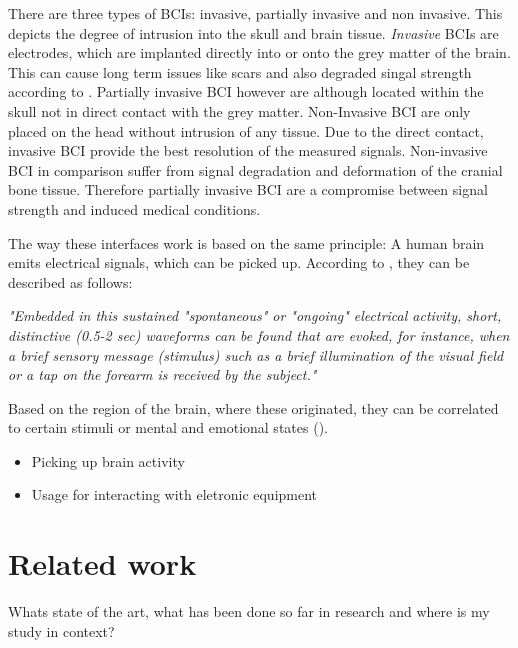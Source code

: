                 There are three types of BCIs: invasive, partially invasive and non invasive. This depicts the degree of intrusion into the skull and brain tissue. \textit{Invasive} BCIs are electrodes, which are implanted directly into or onto the grey matter of the brain. This can cause long term issues like scars and also degraded singal strength according to \cite{Abdulkader.2015}. 
                Partially invasive BCI however are although located within the skull not in direct contact with the grey matter.
                Non-Invasive BCI are only placed on the head without intrusion of any tissue.
                Due to the direct contact, invasive BCI provide the best resolution of the measured signals. Non-invasive BCI in comparison suffer from signal degradation and deformation of the cranial bone tissue. 
                Therefore partially invasive BCI are a compromise between signal strength and induced medical conditions.

                The way these interfaces work is based on the same principle: A human brain emits electrical signals, which can be picked up.
                According to \cite{Vidal.1973}, they can be described as follows:

                \medskip
                \emph{"Embedded in this sustained "spontaneous" or "ongoing" electrical activity, short, distinctive (0.5-2 sec) waveforms can be found that are evoked, for instance, when a brief sensory message (stimulus) such as a brief illumination of the visual field or a tap on the forearm is received by the subject."}
                \medskip

                Based on the region of the brain, where these originated, they can be correlated to certain stimuli or mental and emotional states (\cite{JardimGoncalves.2018}).

            \begin{itemize}
                \item Picking up brain activity
                \item Usage for interacting with eletronic equipment
            \end{itemize}

        \section{Related work}

            Whats state of the art, what has been done so far in research and where is my study in context?

